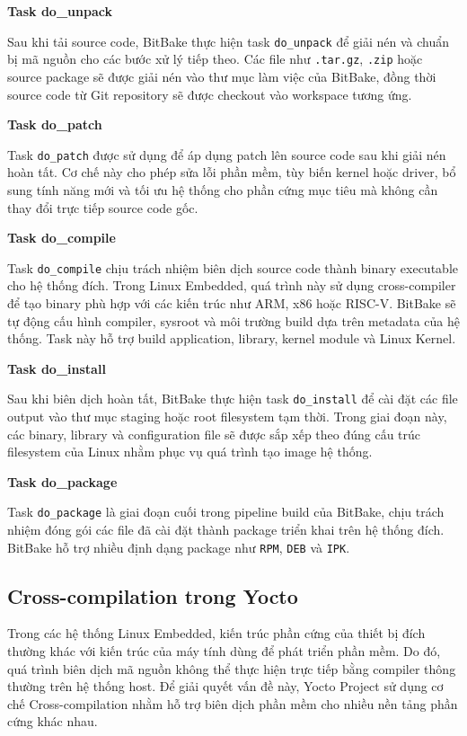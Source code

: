 \noindent \textbf{Task do\_unpack}

Sau khi tải source code, BitBake thực hiện task \texttt{do\_unpack} để giải nén và chuẩn bị mã nguồn cho các bước xử lý tiếp theo. Các file như \texttt{.tar.gz}, \texttt{.zip} hoặc source package sẽ được giải nén vào thư mục làm việc của BitBake, đồng thời source code từ Git repository sẽ được checkout vào workspace tương ứng.

\noindent \textbf{Task do\_patch}

Task \texttt{do\_patch} được sử dụng để áp dụng patch lên source code sau khi giải nén hoàn tất. Cơ chế này cho phép sửa lỗi phần mềm, tùy biến kernel hoặc driver, bổ sung tính năng mới và tối ưu hệ thống cho phần cứng mục tiêu mà không cần thay đổi trực tiếp source code gốc.

\noindent \textbf{Task do\_compile}

Task \texttt{do\_compile} chịu trách nhiệm biên dịch source code thành binary executable cho hệ thống đích. Trong Linux Embedded, quá trình này sử dụng cross-compiler để tạo binary phù hợp với các kiến trúc như ARM, x86 hoặc RISC-V. BitBake sẽ tự động cấu hình compiler, sysroot và môi trường build dựa trên metadata của hệ thống. Task này hỗ trợ build application, library, kernel module và Linux Kernel.

\noindent \textbf{Task do\_install}

Sau khi biên dịch hoàn tất, BitBake thực hiện task \texttt{do\_install} để cài đặt các file output vào thư mục staging hoặc root filesystem tạm thời. Trong giai đoạn này, các binary, library và configuration file sẽ được sắp xếp theo đúng cấu trúc filesystem của Linux nhằm phục vụ quá trình tạo image hệ thống.

\noindent\textbf{Task do\_package}

Task \texttt{do\_package} là giai đoạn cuối trong pipeline build của BitBake, chịu trách nhiệm đóng gói các file đã cài đặt thành package triển khai trên hệ thống đích. BitBake hỗ trợ nhiều định dạng package như \texttt{RPM}, \texttt{DEB} và \texttt{IPK}.

\subsection{Cross-compilation trong Yocto}

Trong các hệ thống Linux Embedded, kiến trúc phần cứng của thiết bị đích thường khác với kiến trúc của máy tính dùng để phát triển phần mềm. Do đó, quá trình biên dịch mã nguồn không thể thực hiện trực tiếp bằng compiler thông thường trên hệ thống host. Để giải quyết vấn đề này, Yocto Project sử dụng cơ chế Cross-compilation nhằm hỗ trợ biên dịch phần mềm cho nhiều nền tảng phần cứng khác nhau.

